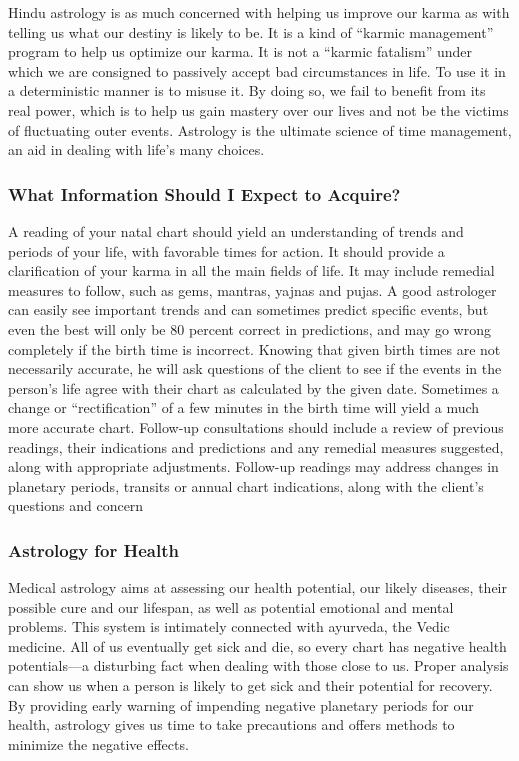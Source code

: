  

Hindu astrology is as much concerned with helping us improve our karma as with telling us what our destiny is likely to be. It is a kind of “karmic management” program to help us optimize our karma. It is not a “karmic fatalism” under which we are consigned to passively accept bad circumstances in life. To use it in a deterministic manner is to misuse it. By doing so, we fail to benefit from its real power, which is to help us gain mastery over our lives and not be the victims of fluctuating outer events. Astrology is the ultimate science of time management, an aid in dealing with life’s many choices.

 

\subsubsection{What Information Should I Expect to Acquire?}
 

A reading of your natal chart should yield an understanding of trends and periods of your life, with favorable times for action. It should provide a clarification of your karma in all the main fields of life. It may include remedial measures to follow, such as gems, mantras, yajnas and pujas. A good astrologer can easily see important trends and can sometimes predict specific events, but even the best will only be 80 percent correct in predictions, and may go wrong completely if the birth time is incorrect. Knowing that given birth times are not necessarily accurate, he will ask questions of the client to see if the events in the person’s life agree with their chart as calculated by the given date. Sometimes a change or “rectification” of a few minutes in the birth time will yield a much more accurate chart. Follow-up consultations should include a review of previous readings, their indications and predictions and any remedial measures suggested, along with appropriate adjustments. Follow-up readings may address changes in planetary periods, transits or annual chart indications, along with the client’s questions and concern

\subsubsection{Astrology for Health}
 

Medical astrology aims at assessing our health potential, our likely diseases, their possible cure and our lifespan, as well as potential emotional and mental problems. This system is intimately connected with ayurveda, the Vedic medicine. All of us eventually get sick and die, so every chart has negative health potentials—a disturbing fact when dealing with those close to us. Proper analysis can show us when a person is likely to get sick and their potential for recovery. By providing early warning of impending negative planetary periods for our health, astrology gives us time to take precautions and offers methods to minimize the negative effects.

